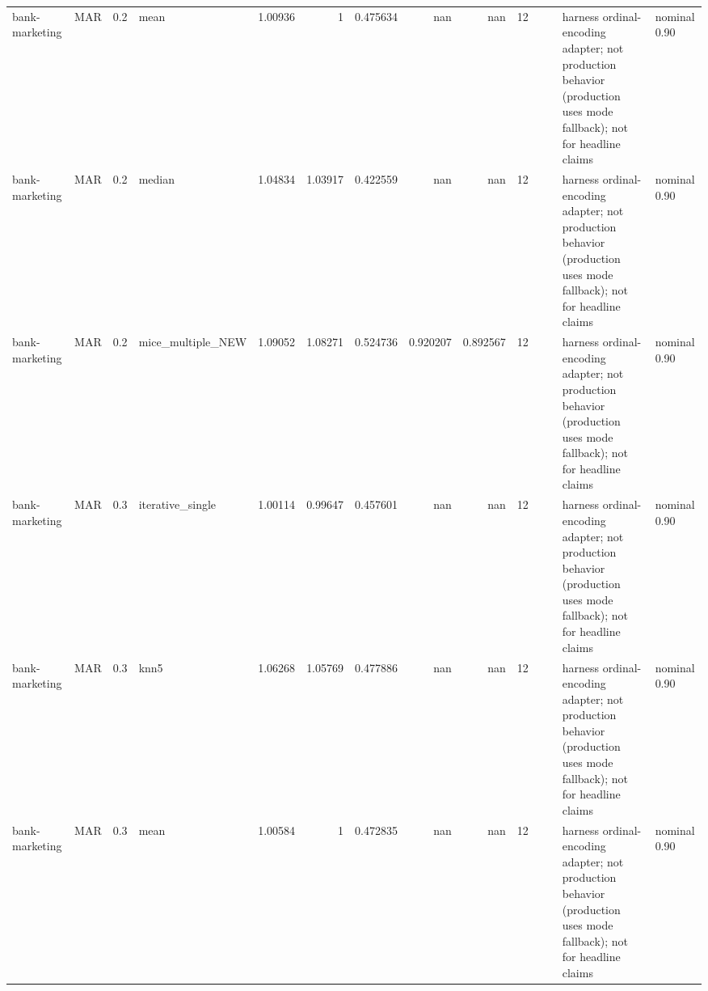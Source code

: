 \begin{table}[ht]
\begin{tabular}{llrlrrrrrrllll}
 bank-marketing       & MAR         &         0.2 & mean              &       1.00936  &             1        &                 0.475634 &                     nan        &                       nan        &        12 &                    &                                         & harness ordinal-encoding adapter; not production behavior (production uses mode fallback); not for headline claims & nominal 0.90              \\
 bank-marketing       & MAR         &         0.2 & median            &       1.04834  &             1.03917  &                 0.422559 &                     nan        &                       nan        &        12 &                    &                                         & harness ordinal-encoding adapter; not production behavior (production uses mode fallback); not for headline claims & nominal 0.90              \\
 bank-marketing       & MAR         &         0.2 & mice\_multiple\_NEW &       1.09052  &             1.08271  &                 0.524736 &                       0.920207 &                         0.892567 &        12 &                    &                                         & harness ordinal-encoding adapter; not production behavior (production uses mode fallback); not for headline claims & nominal 0.90              \\
 bank-marketing       & MAR         &         0.3 & iterative\_single  &       1.00114  &             0.99647  &                 0.457601 &                     nan        &                       nan        &        12 &                    &                                         & harness ordinal-encoding adapter; not production behavior (production uses mode fallback); not for headline claims & nominal 0.90              \\
 bank-marketing       & MAR         &         0.3 & knn5              &       1.06268  &             1.05769  &                 0.477886 &                     nan        &                       nan        &        12 &                    &                                         & harness ordinal-encoding adapter; not production behavior (production uses mode fallback); not for headline claims & nominal 0.90              \\
 bank-marketing       & MAR         &         0.3 & mean              &       1.00584  &             1        &                 0.472835 &                     nan        &                       nan        &        12 &                    &                                         & harness ordinal-encoding adapter; not production behavior (production uses mode fallback); not for headline claims & nominal 0.90              \\

\end{tabular}
\end{table}
